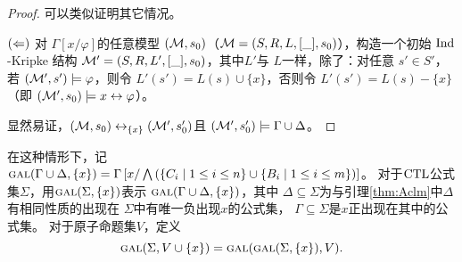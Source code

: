 \begin{proof}
	可以类似证明其它情况。
	
	
	$(\Leftarrow)$ 对 $\Gamma\left[x/\varphi \right]$的任意模型 $({\cal M}, s_0)$（${\cal M} = (S, R, L,[\_], s_0)$），构造一个初始 $\textrm{Ind}$-Kripke 结构 ${\cal M}'=(S, R, L',[\_], s_0)$，其中$L'$与 $L$一样，除了：对任意 $s'\in S'$，若 $({\cal M}', s') \models \varphi$，则令 $L'(s') = L(s) \cup \{x\}$，否则令 $L'(s') = L(s)-\{x\}$（即 $({\cal M}', s_0) \models x \leftrightarrow \varphi$）。
	
	显然易证，$({\cal M},s_0) \leftrightarrow_{\{x\}} ({\cal M}', s_0')$且 $({\cal M}',s_0') \models \Gamma \cup \Delta$。
\end{proof}


在这种情形下，记 $\textsc{gal}(\Gamma\cup\Delta,\{x\})=\Gamma\left[x/\bigwedge\left(\{C_i\mid 1\le i\le n\}\cup\{B_i\mid 1\le i\le m\}\right)\right]$。
%
对于$\textrm{CTL}$公式集$\Sigma$，用$\textsc{gal}(\Sigma,\{x\})$表示 $\textsc{gal}(\Gamma\cup\Delta,\{x\})$，其中 $\Delta\subseteq\Sigma$为与引理\ref{thm:Aclm}中$\Delta$有相同性质的出现在 $\Sigma$中有唯一负出现$x$的公式集， $\Gamma\subseteq \Sigma$是$x$正出现在其中的公式集。 
对于原子命题集$V$，定义
$$\textsc{gal}(\Sigma,V\cup\{x\})=\textsc{gal}(\textsc{gal}(\Sigma,\{x\}),V).$$

